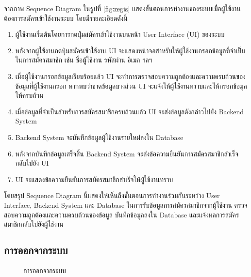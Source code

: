 \documentclass[14pt,oneside,openright,a4paper]{cpe-thai-project}
\begin{document}
จากภาพ Sequence Diagram ในรูปที่ \ref{fig:regis} แสดงขั้นตอนการทำงานของระบบเมื่อผู้ใช้งานต้องการสมัครเข้าใช้งานระบบ โดยมีรายละเอียดดังนี้
\begin{enumerate}
  \item ผู้ใช้งานเริ่มต้นโดยการกดปุ่มสมัครเข้าใช้งานบนหน้า User Interface (UI) ของระบบ
  \item หลังจากผู้ใช้งานกดปุ่มสมัครเข้าใช้งาน UI จะแสดงหน้าจอสำหรับให้ผู้ใช้งานกรอกข้อมูลที่จำเป็นในการสมัครสมาชิก เช่น ชื่อผู้ใช้งาน รหัสผ่าน อีเมล ฯลฯ
  \item เมื่อผู้ใช้งานกรอกข้อมูลเรียบร้อยแล้ว UI จะทำการตรวจสอบความถูกต้องและความครบถ้วนของข้อมูลที่ผู้ใช้งานกรอก หากพบว่าขาดข้อมูลบางส่วน UI จะแจ้งให้ผู้ใช้งานทราบและให้กรอกข้อมูลให้ครบถ้วน
  \item เมื่อข้อมูลที่จำเป็นสำหรับการสมัครสมาชิกครบถ้วนแล้ว UI จะส่งข้อมูลดังกล่าวไปยัง Backend System
  \item Backend System จะบันทึกข้อมูลผู้ใช้งานรายใหม่ลงใน Database
  \item หลังจากบันทึกข้อมูลเสร็จสิ้น Backend System จะส่งข้อความยืนยันการสมัครสมาชิกสำเร็จกลับไปยัง UI
  \item UI จะแสดงข้อความยืนยันการสมัครสมาชิกสำเร็จให้ผู้ใช้งานทราบ
\end{enumerate}
โดยสรุป Sequence Diagram นี้แสดงให้เห็นถึงขั้นตอนการทำงานร่วมกันระหว่าง User Interface, Backend System และ Database ในการรับข้อมูลการสมัครสมาชิกจากผู้ใช้งาน ตรวจสอบความถูกต้องและความครบถ้วนของข้อมูล บันทึกข้อมูลลงใน Database และแจ้งผลการสมัครสมาชิกกลับไปยังผู้ใช้งาน

\newpage


\subsection{การออกจากระบบ}

  \begin{figure}[!h]\centering
    \setlength{\fboxrule}{0.5mm} %
    \setlength{\fboxsep}{0.5cm}
    \caption{การออกจากระบบ}\label{fig:logout}
  \end{figure} 
\end{document}
